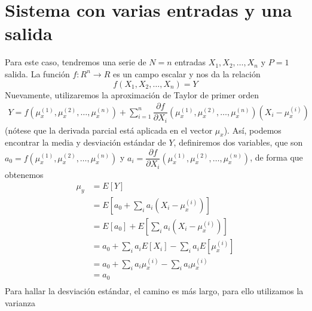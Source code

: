\documentclass[a4paper, 10pt]{article}
\begin{document}
\section{Sistema con varias entradas y una salida}
Para este caso, tendremos una serie de $N = n$ entradas $X_1,X_2,\dots,X_n$ y $P = 1$ salida.
La función $f:R^{n} \to R$ es un campo escalar y nos da la relación
\begin{equation}
    f(X_1,X_2,\dots,X_n) = Y
\end{equation}
Nuevamente, utilizaremos la aproximación de Taylor de primer orden
\begin{equation}
    \begin{split}
        Y = f(\mu_x^{(1)}, \mu_x^{(2)},\dots,\mu_x^{(n)}) +
        \sum_{i=1}^{n}{\dfrac{\partial f}{\partial X_i}
        \left(\mu_x^{(1)}, \mu_x^{(2)},\dots,\mu_x^{(n)}\right)(X_i-\mu^{(i)}_x)}
    \end{split}
\end{equation}
(nótese que la derivada parcial está aplicada en el vector $\mu_x$). Así, podemos encontrar la
media y desviación estándar de $Y$, definiremos dos variables, que son
$a_0 = f(\mu_x^{(1)}, \mu_x^{(2)},\dots,\mu_x^{(n)})$ y $a_i = \dfrac{\partial f}{\partial X_i}\left(\mu_x^{(1)}, \mu_x^{(2)},\dots,\mu_x^{(n)}\right)$,
de forma que obtenemos
\begin{equation}
    \begin{split}
        \mu_y & = E\left[Y\right] \\
        &=E\left[a_0 + \sum_{i}^{}{a_i(X_i-\mu_x^{(i)})}\right] \\
        &=E[a_0] + E\left[\sum_{i}^{}{a_i(X_i-\mu_x^{(i)})}\right] \\
        &=a_0 + \sum_{i}^{}a_iE\left[{X_i}\right] - \sum_{i}^{}a_iE\left[\mu_x^{(i)}\right] \\
        &=a_0 + \sum_{i}^{}a_i\mu_x^{(i)} - \sum_{i}^{}a_i\mu_x^{(i)} \\
        &=a_0 \\[2em]
    \end{split}
\end{equation}
Para hallar la desviación estándar, el camino es más largo, para ello utilizamos la varianza
\end{document}
